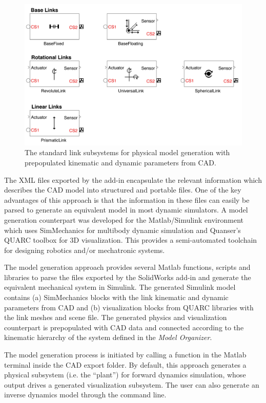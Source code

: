 \begin{figure}[!b]
	\centering
    \includegraphics[scale=0.75]{fig/ch3/simmech.pdf}
  	\caption{The standard link subsystems for physical model generation with prepopulated kinematic and dynamic parameters from CAD.}
	\label{fig:quarcmech}
\end{figure}


The XML files exported by the add-in encapsulate the relevant information which describes the CAD model into structured and portable files. One of the key advantages of this approach is that the information in these files can easily be parsed to generate an equivalent model in most dynamic simulators. A model generation counterpart was developed for the Matlab/Simulink environment which uses SimMechanics for multibody dynamic simulation and Quanser's QUARC toolbox for 3D visualization. This provides a semi-automated toolchain for designing robotics and/or mechatronic systems.

The model generation approach provides several Matlab functions, scripts and libraries to parse the files exported by the SolidWorks add-in and generate the equivalent mechanical system in Simulink. The generated Simulink model contains (a) SimMechanics blocks with the link kinematic and dynamic parameters from CAD and (b) visualization blocks from QUARC libraries with the link meshes and scene file. The generated physics and visualization counterpart is prepopulated with CAD data and connected according to the kinematic hierarchy of the system defined in the \emph{Model Organizer}.

The model generation process is initiated by calling a function in the Matlab terminal inside the CAD export folder. By default, this approach generates a physical subsystem (i.e. the “plant”) for forward dynamics simulation, whose output drives a generated visualization subsystem. The user can also generate an inverse dynamics model through the command line.

